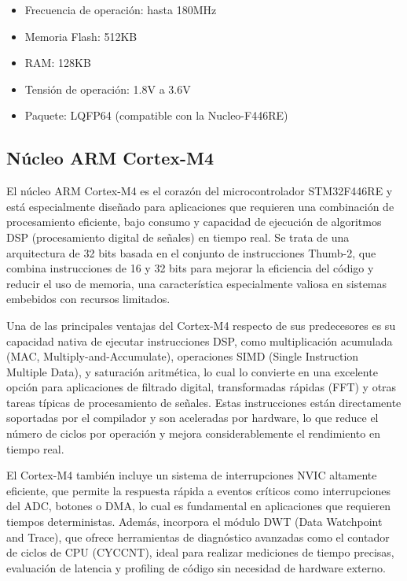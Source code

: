 \documentclass[12pt]{article}
\begin{document}
	\begin{itemize}
		\item Frecuencia de operación: hasta 180MHz
		
		\item Memoria Flash: 512KB
		
		\item RAM: 128KB
		
		\item Tensión de operación: 1.8V a 3.6V
		
		\item Paquete: LQFP64 (compatible con la Nucleo-F446RE)
	\end{itemize}
	
	\subsection{Núcleo ARM Cortex-M4}
	El núcleo ARM Cortex-M4 es el corazón del microcontrolador STM32F446RE y está especialmente diseñado para aplicaciones que requieren una combinación de procesamiento eficiente, bajo consumo y capacidad de ejecución de algoritmos DSP (procesamiento digital de señales) en tiempo real. Se trata de una arquitectura de 32 bits basada en el conjunto de instrucciones Thumb-2, que combina instrucciones de 16 y 32 bits para mejorar la eficiencia del código y reducir el uso de memoria, una característica especialmente valiosa en sistemas embebidos con recursos limitados.
	
	Una de las principales ventajas del Cortex-M4 respecto de sus predecesores es su capacidad nativa de ejecutar instrucciones DSP, como multiplicación acumulada (MAC, Multiply-and-Accumulate), operaciones SIMD (Single Instruction Multiple Data), y saturación aritmética, lo cual lo convierte en una excelente opción para aplicaciones de filtrado digital, transformadas rápidas (FFT) y otras tareas típicas de procesamiento de señales. Estas instrucciones están directamente soportadas por el compilador y son aceleradas por hardware, lo que reduce el número de ciclos por operación y mejora considerablemente el rendimiento en tiempo real.
	
	El Cortex-M4 también incluye un sistema de interrupciones NVIC altamente eficiente, que permite la respuesta rápida a eventos críticos como interrupciones del ADC, botones o DMA, lo cual es fundamental en aplicaciones que requieren tiempos deterministas. Además, incorpora el módulo DWT (Data Watchpoint and Trace), que ofrece herramientas de diagnóstico avanzadas como el contador de ciclos de CPU (CYCCNT), ideal para realizar mediciones de tiempo precisas, evaluación de latencia y profiling de código sin necesidad de hardware externo.
	
\end{document}
